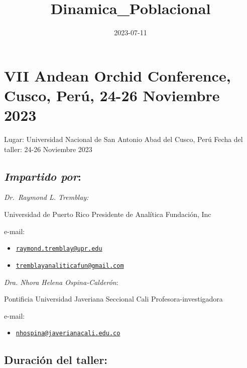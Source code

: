\documentclass[
]{book}
\title{Dinamica\_Poblacional}
\author{}
\date{\vspace{-2.5em}2023-07-11}
\providecommand{\tightlist}{%
  \setlength{\itemsep}{0pt}\setlength{\parskip}{0pt}}
\theoremstyle{definition}
\theoremstyle{definition}
\theoremstyle{definition}
\theoremstyle{definition}
\theoremstyle{remark}
\begin{document}
\maketitle

{
\setcounter{tocdepth}{1}
\tableofcontents
}
\hypertarget{sec-vii-andean-orchid-conference-cusco-peruxfa-24-26-noviembre-2023}{%
\chapter{VII Andean Orchid Conference, Cusco, Perú, 24-26 Noviembre 2023}\label{sec-vii-andean-orchid-conference-cusco-peruxfa-24-26-noviembre-2023}}

Lugar: Universidad Nacional de San Antonio Abad del Cusco, Perú Fecha
del taller: 24-26 Noviembre 2023

\hypertarget{impartido-por}{%
\section{\texorpdfstring{\emph{Impartido por}:}{Impartido por:}}\label{impartido-por}}

\emph{Dr.~Raymond L. Tremblay:}

Universidad de Puerto Rico Presidente de Analítica Fundación, Inc

e-mail:

\begin{itemize}
\item
  \href{mailto:raymond.tremblay@upr.edu}{\nolinkurl{raymond.tremblay@upr.edu}}
\item
  \href{mailto:tremblayanaliticafun@gmail.com}{\nolinkurl{tremblayanaliticafun@gmail.com}}
\end{itemize}

\emph{Dra. Nhora Helena Ospina-Calderón}:

Pontificia Universidad Javeriana Seccional Cali Profesora-investigadora

e-mail:

\begin{itemize}
\tightlist
\item
  \href{mailto:nhospina@javerianacali.edu.co}{\nolinkurl{nhospina@javerianacali.edu.co}}
\end{itemize}

\hypertarget{duraciuxf3n-del-taller}{%
\section{Duración del taller:}\label{duraciuxf3n-del-taller}}
\end{document}
